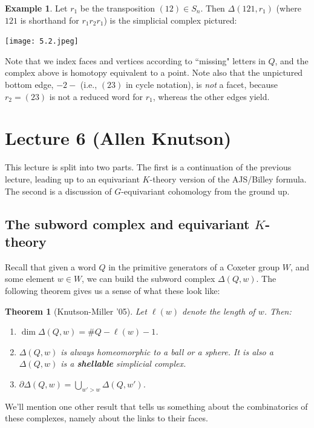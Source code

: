 \documentclass[12pt]{amsart}
\numberwithin{equation}{section}
\newtheorem{Theorem}[equation]{Theorem}
\theoremstyle{definition}
\newtheorem{Example}[equation]{Example}
\numberwithin{figure}{section}
\begin{document}
\begin{Example}
Let $r_1$ be the transposition $(12) \in S_n$. Then $\Delta(121, r_1)$ (where $121$ is shorthand for $r_1 r_2 r_1$) is the simplicial complex pictured: \vspace{1em}

\centerline{\texttt{[image: 5.2.jpeg]}}

Note that we index faces and vertices according to ``missing" letters in $Q$, and the complex above is homotopy equivalent to a point. Note also that the unpictured bottom edge, $-2-$ (i.e., $(23)$ in cycle notation), is \textit{not} a facet, because $r_2 = (23)$ is not a reduced word for $r_1$, whereas the other edges yield.
\end{Example}

\section{Lecture 6 (Allen Knutson)}
This lecture is split into two parts.  The first is a continuation of the previous lecture, leading up to an equivariant $K$-theory version of the AJS/Billey formula.  The second is a discussion of $G$-equivariant cohomology from the ground up.

\subsection{The subword complex and equivariant $K$-theory} Recall that given a word $Q$ in the primitive generators of a Coxeter group $W$, and some element $w\in W$, we can build the subword complex $\Delta(Q,w)$. The following theorem gives us a sense of what these look like:

\begin{Theorem}[Knutson-Miller '05] Let $\ell(w)$ denote the length of $w$. Then:
\begin{enumerate}
    \item $\dim \Delta(Q,w) = \# Q - \ell(w) - 1$.
    \item $\Delta (Q,w)$ is always homeomorphic to a ball or a sphere. It is also a $\Delta(Q,w)$ is a \textbf{shellable}  simplicial complex.  
    \item $\partial \Delta(Q,w) = \bigcup_{ w' > w} \Delta(Q,w')$.
\end{enumerate}
\end{Theorem}

We'll mention one other result that tells us something about the combinatorics of these complexes, namely about the links to their faces.
\end{document}
